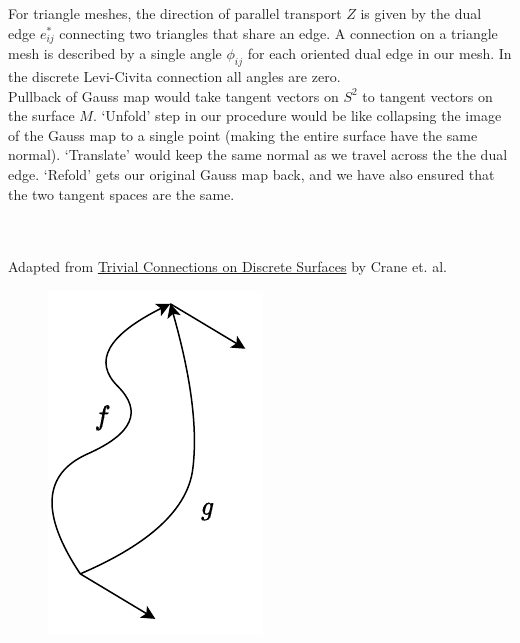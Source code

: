 \documentclass{article}
\begin{document}
\vspace{1.8cm}
\\\\

For triangle meshes, the direction of parallel transport $Z$ is given by the dual edge $e^*_{ij}$
connecting two triangles that share an edge. A connection on a triangle mesh is described by a single angle $\phi_{ij}$
for each oriented dual edge in our mesh. In the discrete Levi-Civita connection all angles are zero. \\

Pullback of Gauss map would take tangent vectors on $S^2$ to tangent vectors on the surface $M$. `Unfold' step
in our procedure would be like collapsing the image of the Gauss map to a single point (making the entire surface have 
the same normal). `Translate' would keep the same normal as we travel across the the dual edge. `Refold' gets our original
Gauss map back, and we have also ensured that the two tangent spaces are the same.


\vspace{1.8cm}
\\\\


Adapted from \href{https://www.cs.cmu.edu/~kmcrane/Projects/TrivialConnections/}{Trivial Connections on Discrete Surfaces}
by Crane et. al. \\

\begin{figure}[h]
    \centering
    \includegraphics[scale=0.5]{figs/loop.pdf}
\end{figure}
\end{document}
